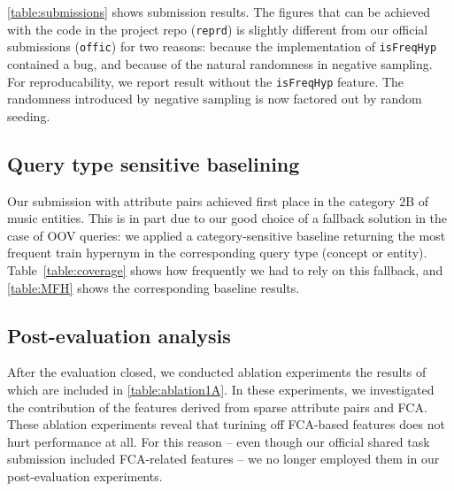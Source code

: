 \documentclass[11pt,a4paper]{article}
\begin{document}
\autoref{table:submissions} shows submission results.
The figures that can be achieved with the code in the project repo
(\texttt{reprd}) is slightly different from our official submissions
(\texttt{offic}) for two reasons:
because the implementation of \texttt{isFreqHyp} contained a bug, and because
of the natural randomness in negative sampling.
For reproducability, we report result without the \texttt{isFreqHyp} feature.
The randomness introduced by negative sampling is now factored out by random
seeding.






\subsection{Query type sensitive baselining}

Our submission with attribute pairs achieved first place in the category 2B of
music entities. This is in part due to our good choice of a fallback solution
in the case of OOV queries: we applied a category-sensitive baseline returning
the most frequent train hypernym in the corresponding query type (concept or
entity).  Table~\ref{table:coverage} shows how frequently we had to rely on
this fallback, and \autoref{table:MFH} shows the corresponding baseline
results.



\subsection{Post-evaluation analysis}





After the evaluation closed, we conducted ablation experiments the results of 
which are included in
\autoref{table:ablation1A}. In these experiments, we investigated the 
contribution of the features derived from sparse attribute pairs and FCA.
These ablation experiments reveal that turining off FCA-based features does 
not hurt performance at all. For this reason -- even though our official shared 
task submission included FCA-related features -- we no longer employed them in 
our post-evaluation experiments.
\end{document}
